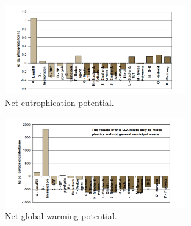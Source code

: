 \documentclass{mcmthesis}
\begin{document}
\begin{figure}[!htb] %
	\centering %
	\includegraphics[width=0.7\textwidth]{figures/PCA1.png} %
	\caption{Net eutrophication potential.} %
	\label{fig6} %
	
\end{figure}

\begin{figure}[!htb] %
	\centering %
	\includegraphics[width=0.7\textwidth]{figures/PCA2.png} %
	\caption{Net global warming potential.} %
	\label{fig7} %
	
\end{figure}

\end{document}
